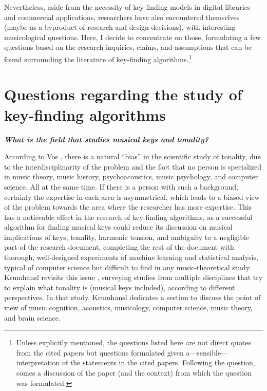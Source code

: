Nevertheless, aside from the necessity of key-finding models in digital libraries and commercial applications, researchers have also encountered themselves (maybe as a byproduct of research and design decisions), with interesting musicological questions. Here, I decide to concentrate on those, formulating a few questions based on the research inquiries, claims, and assumptions that can be found surrounding the literature of key-finding algorithms.\footnote{Unless explicitly mentioned, the questions listed here are not direct quotes from the cited papers but questions formulated given a---sensible---interpretation of the statements in the cited papers. Following the question, comes a discussion of the paper (and the context) from which the question was formulated.}

\section{Questions regarding the study of key-finding algorithms}

\textbf{\emph{What is the field that studies musical keys and tonality?}}

According to Vos \cite{vos2000tonality}, there is a natural ``bias'' in the scientific study of tonality, due to the interdisciplinarity of the problem and the fact that no person is specialized in music theory, music history, psychoacoustics, music psychology, and computer science. All at the same time. If there is a person with such a background, certainly the expertise in each area is asymmetrical, which leads to a biased view of the problem towards the area where the researcher has more expertise. This has a noticeable effect in the research of key-finding algorithms, as a successful algorithm for finding musical keys \cite{korzeniowski2018harmonic}  could reduce its discussion on musical implications of keys, tonality, harmonic tension, and ambiguity to a negligible part of the research document, completing the rest of the document with thorough, well-designed experiments of machine learning and statistical analysis, typical of computer science but difficult to find in any music-theoretical study. Krumhansl revisits this issue \cite{krumhansl2004cognition}, surveying studies from multiple disciplines that try to explain what tonality is (musical keys included), according to different perspectives. In that study, Krumhansl dedicates a section to discuss the point of view of music cognition, acoustics, musicology, computer science, music theory, and brain science. 

